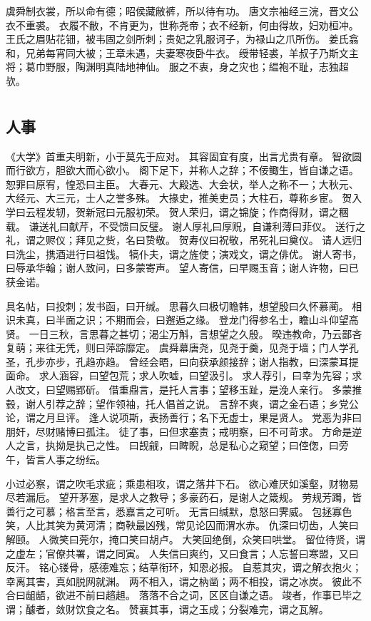 \documentclass[12pt,UTF8]{ctexbook}
\begin{document}
虞舜制衣裳，所以命有德；昭侯藏敝裤，所以待有功。
唐文宗袖经三浣，晋文公衣不重裘。
衣履不敝，不肯更为，世称尧帝；衣不经新，何由得故，妇劝桓冲。
王氏之眉贴花钿，被韦固之剑所刺；贵妃之乳服诃子，为禄山之爪所伤。
姜氏翕和，兄弟每宵同大被；王章未遇，夫妻寒夜卧牛衣。
绶带轻裘，羊叔子乃斯文主将；葛巾野服，陶渊明真陆地神仙。
服之不衷，身之灾也；緼袍不耻，志独超欤。

\part{}

\chapter{人事}

《大学》首重夫明新，小于莫先于应对。
其容固宜有度，出言尤贵有章。
智欲圆而行欲方，胆欲大而心欲小。
阁下足下，并称人之辞；不佞鲰生，皆自谦之语。
恕罪曰原宥，惶恐曰主臣。
大春元、大殿选、大会状，举人之称不一；大秋元、大经元、大三元，士人之誉多殊。
大掾史，推美吏员；大柱石，尊称乡宦。
贺入学曰云程发轫，贺新冠曰元服初荣。
贺人荣归，谓之锦旋；作商得财，谓之稇载。
谦送礼曰献芹，不受馈曰反璧。
谢人厚礼曰厚贶，自谦利薄曰菲仪。
送行之礼，谓之赆仪；拜见之赀，名曰贽敬。
贺寿仪曰祝敬，吊死礼曰奠仪。
请人远归曰洗尘，携酒进行曰祖饯。
犒仆夫，谓之旌使；演戏文，谓之俳优。
谢人寄书，曰辱承华翰；谢人致问，曰多蒙寄声。
望人寄信，曰早赐玉音；谢人许物，曰已获金诺。

具名帖，曰投刺；发书函，曰开缄。
思暮久曰极切瞻韩，想望殷曰久怀慕蔺。
相识未真，曰半面之识；不期而会，曰邂逅之缘。
登龙门得参名士，瞻山斗仰望高贤。
一日三秋，言思暮之甚切；渴尘万斛，言想望之久殷。
暌违教命，乃云鄙吝复萌；来往无凭，则曰萍踪靡定。
虞舜幕唐尧，见尧于羹，见尧于墙；门人学孔圣，孔步亦步，孔趋亦趋。
曾经会晤，曰向获承颜接辞；谢人指教，曰深蒙耳提面命。
求人涵容，曰望包荒；求人吹嘘，曰望汲引。
求人荐引，曰幸为先容；求人改文，曰望赐郢斫。
借重鼎言，是托人言事；望移玉趾，是浼人亲行。
多蒙推毂，谢人引荐之辞；望作领袖，托人倡首之说。
言辞不爽，谓之金石语；乡党公论，谓之月旦评。
逢人说项斯，表扬善行；名下无虚士，果是贤人。
党恶为非曰朋奸，尽财赌博曰孤注。
徒了事，曰但求塞责；戒明察，曰不可苛求。
方命是逆人之言，执拗是执己之性。
曰觊觎，曰睥睨，总是私心之窥望；曰倥偬，曰旁午，皆言人事之纷纭。

小过必察，谓之吹毛求疵；乘患相攻，谓之落井下石。
欲心难厌如溪壑，财物易尽若漏卮。
望开茅塞，是求人之教导；多豪药石，是谢人之箴规。
劳规芳躅，皆善行之可慕；格言至言，悉嘉言之可听。
无言曰缄默，息怒曰霁威。
包拯寡色笑，人比其笑为黄河清；商鞅最凶残，常见论囚而渭水赤。
仇深曰切齿，人笑曰解颐。
人微笑曰莞尔，掩口笑曰胡卢。
大笑回绝倒，众笑曰哄堂。
留位待贤，谓之虚左；官僚共署，谓之同寅。
人失信曰爽约，又曰食言；人忘誓曰寒盟，又曰反汗。
铭心镂骨，感德难忘；结草衔环，知恩必报。
自惹其灾，谓之解衣抱火；幸离其害，真如脱网就渊。
两不相入，谓之枘凿；两不相投，谓之冰炭。
彼此不合曰龃龉，欲进不前曰趦趄。
落落不合之词，区区自谦之语。
竣者，作事已毕之谓；醵者，敛财饮食之名。
赞襄其事，谓之玉成；分裂难完，谓之瓦解。
\end{document}
